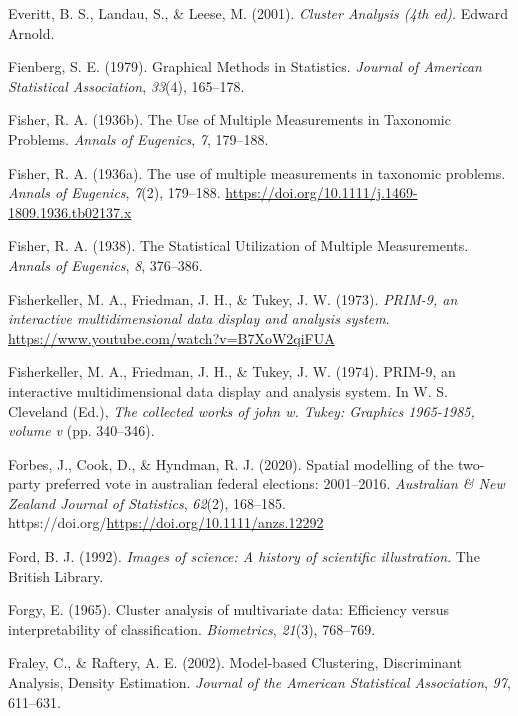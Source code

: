 \documentclass[
  letterpaper,
]{krantz}
\newlength{\cslhangindent}
\newenvironment{CSLReferences}[2] %
 {\begin{list}{}{%
  \setlength{\itemindent}{0pt}
  \setlength{\leftmargin}{0pt}
  \setlength{\parsep}{0pt}
  \ifodd #1
   \setlength{\leftmargin}{\cslhangindent}
   \setlength{\itemindent}{-1\cslhangindent}
  \fi
  \setlength{\itemsep}{#2\baselineskip}}}
 {\end{list}}
\begin{document}
\begin{CSLReferences}{1}{0}
Everitt, B. S., Landau, S., \& Leese, M. (2001). \emph{Cluster
{A}nalysis (4th ed)}. Edward Arnold.

Fienberg, S. E. (1979). Graphical {M}ethods in {S}tatistics.
\emph{Journal of American Statistical Association}, \emph{33}(4),
165--178.

Fisher, R. A. (1936b). The {U}se of {M}ultiple {M}easurements in
{T}axonomic {P}roblems. \emph{Annals of Eugenics}, \emph{7}, 179--188.

Fisher, R. A. (1936a). The use of multiple measurements in taxonomic
problems. \emph{Annals of Eugenics}, \emph{7}(2), 179--188.
\url{https://doi.org/10.1111/j.1469-1809.1936.tb02137.x}

Fisher, R. A. (1938). The {S}tatistical {U}tilization of {M}ultiple
{M}easurements. \emph{Annals of Eugenics}, \emph{8}, 376--386.

Fisherkeller, M. A., Friedman, J. H., \& Tukey, J. W. (1973).
\emph{{PRIM-9}, an interactive multidimensional data display and
analysis system}. \url{https://www.youtube.com/watch?v=B7XoW2qiFUA}

Fisherkeller, M. A., Friedman, J. H., \& Tukey, J. W. (1974). {PRIM-9},
an interactive multidimensional data display and analysis system. In W.
S. Cleveland (Ed.), \emph{The collected works of john w. Tukey: Graphics
1965-1985, volume v} (pp. 340--346).

Forbes, J., Cook, D., \& Hyndman, R. J. (2020). Spatial modelling of the
two-party preferred vote in australian federal elections: 2001--2016.
\emph{Australian \& New Zealand Journal of Statistics}, \emph{62}(2),
168--185. https://doi.org/\url{https://doi.org/10.1111/anzs.12292}

Ford, B. J. (1992). \emph{Images of science: A history of scientific
illustration}. The British Library.

Forgy, E. (1965). Cluster analysis of multivariate data: Efficiency
versus interpretability of classification. \emph{Biometrics},
\emph{21}(3), 768--769.

Fraley, C., \& Raftery, A. E. (2002). Model-based {C}lustering,
{D}iscriminant {A}nalysis, {D}ensity {E}stimation. \emph{Journal of the
American Statistical Association}, \emph{97}, 611--631.


\end{CSLReferences}
\end{document}
